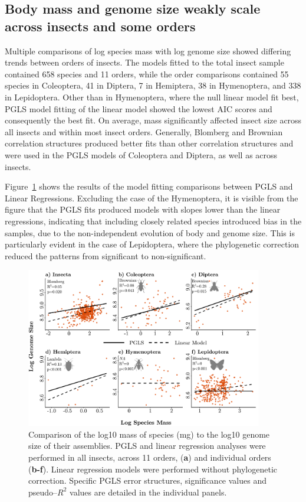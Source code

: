 \documentclass[11pt]{article}
\begin{document}
\subsection{Body mass and genome size weakly scale across insects and some orders}
Multiple comparisons of log species mass with log genome size showed differing trends between orders of insects. The models fitted to the total insect sample contained 658 species and 11 orders, while the order comparisons contained 55 species in Coleoptera, 41 in Diptera, 7 in Hemiptera, 38 in Hymenoptera, and 338 in Lepidoptera. Other than in Hymenoptera, where the null linear model fit best, PGLS model fitting of the linear model showed the lowest AIC scores and consequently the best fit. On average, mass significantly affected insect size across all insects and within most insect orders. Generally, Blomberg and Brownian correlation structures produced better fits than other correlation structures and were used in the PGLS models of Coleoptera and Diptera, as well as across insects. 

Figure~\ref{fig:genome-mass-figure} shows the results of the model fitting comparisons between PGLS and Linear Regressions. Excluding the case of the Hymenoptera, it is visible from the figure that the PGLS fits produced models with slopes lower than the linear regressions, indicating that including closely related species introduced bias in the samples, due to the non-independent evolution of body and genome size. This is particularly evident in the case of Lepidoptera, where the phylogenetic correction reduced the patterns from significant to non-significant. 
\begin{figure}[H]
    \justifying
    \includegraphics[width=0.92\textwidth]{figures/mass_genome_figure_orange.pdf}
    \caption{Comparison of the log10 mass of species (mg) to the log10 genome size of their assemblies. PGLS and linear regression analyses were performed in all insects, across 11 orders, (\textbf{a}) and individual orders (\textbf{b-f}). Linear regression models were performed without phylogenetic correction. Specific PGLS error structures, significance values and pseudo--$R^2$ values are detailed in the individual panels.}
    \label{fig:genome-mass-figure}
\end{figure}
\pagebreak
\end{document}
